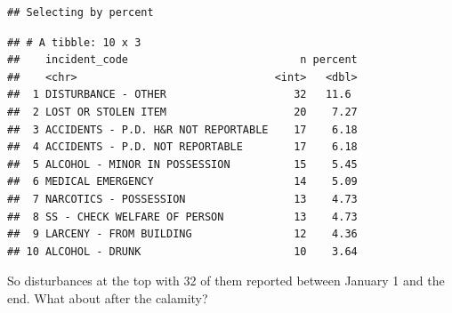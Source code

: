 \documentclass[]{book}
\newenvironment{Shaded}{\begin{snugshade}}{\end{snugshade}}
\newcommand{\DataTypeTok}[1]{\textcolor[rgb]{0.13,0.29,0.53}{#1}}
\newcommand{\DecValTok}[1]{\textcolor[rgb]{0.00,0.00,0.81}{#1}}
\newcommand{\KeywordTok}[1]{\textcolor[rgb]{0.13,0.29,0.53}{\textbf{#1}}}
\newcommand{\NormalTok}[1]{#1}
\newcommand{\OperatorTok}[1]{\textcolor[rgb]{0.81,0.36,0.00}{\textbf{#1}}}
\newcommand{\OtherTok}[1]{\textcolor[rgb]{0.56,0.35,0.01}{#1}}
\newcommand{\StringTok}[1]{\textcolor[rgb]{0.31,0.60,0.02}{#1}}
\begin{document}
\begin{Shaded}
\end{Shaded}

\begin{verbatim}
## Selecting by percent
\end{verbatim}

\begin{verbatim}
## # A tibble: 10 x 3
##    incident_code                           n percent
##    <chr>                               <int>   <dbl>
##  1 DISTURBANCE - OTHER                    32   11.6 
##  2 LOST OR STOLEN ITEM                    20    7.27
##  3 ACCIDENTS - P.D. H&R NOT REPORTABLE    17    6.18
##  4 ACCIDENTS - P.D. NOT REPORTABLE        17    6.18
##  5 ALCOHOL - MINOR IN POSSESSION          15    5.45
##  6 MEDICAL EMERGENCY                      14    5.09
##  7 NARCOTICS - POSSESSION                 13    4.73
##  8 SS - CHECK WELFARE OF PERSON           13    4.73
##  9 LARCENY - FROM BUILDING                12    4.36
## 10 ALCOHOL - DRUNK                        10    3.64
\end{verbatim}

So disturbances at the top with 32 of them reported between January 1 and the end. What about after the calamity?

\begin{Shaded}
\end{Shaded}
\end{document}
